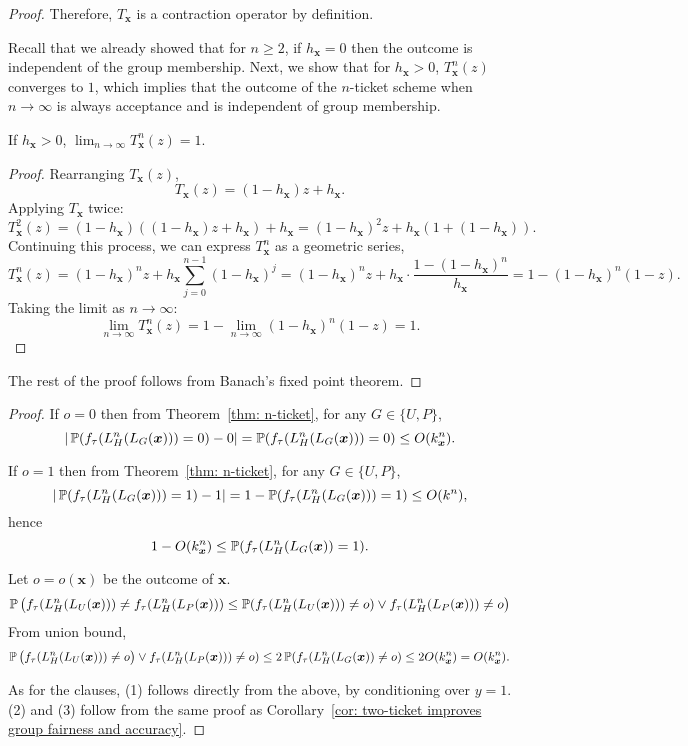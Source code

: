 \begin{proof}
Therefore, $T_{\bm{x}}$ is a contraction operator by definition.

Recall that we already showed that for $n\geq 2$, if $h_{\bm{x}}=0$ then the outcome is independent of the group membership. Next, we show that for $h_{\bm{x}}>0$, $T_{\bm{x}}^n(z)$ converges to $1$, which implies that the outcome of the $n$-ticket scheme when $n\rightarrow \infty$ is always acceptance and is independent of group membership.
\begin{claim}\label{claim:Tconvergence}
If $h_{\bm{x}}>0$, $
\lim_{n \to \infty} T_{\bm{x}}^n(z) =1$.
\end{claim}
\begin{proof}
Rearranging $T_{\bm{x}}(z)$,
\[
T_{\bm{x}}(z) = (1 - h_{\bm{x}})z + h_{\bm{x}}.
\]
Applying $T_{\bm{x}}$ twice:
\[
T_{\bm{x}}^2(z) = (1 - h_{\bm{x}})((1 - h_{\bm{x}})z + h_{\bm{x}}) + h_{\bm{x}}= (1 - h_{\bm{x}})^2 z + h_{\bm{x}}(1 + (1 - h_{\bm{x}})).
\]
Continuing this process, we can express $T_{\bm{x}}^n$ as a geometric series,
\[
T_{\bm{x}}^n(z) = (1 - h_{\bm{x}})^n z + h_{\bm{x}} \sum_{j=0}^{n-1} (1 - h_{\bm{x}})^j= (1 - h_{\bm{x}})^n z + h_{\bm{x}} \cdot \frac{1 - (1 - h_{\bm{x}})^n}{h_{\bm{x}}}= 1 - (1 - h_{\bm{x}})^n(1 - z).
\]
Taking the limit as \( n \to \infty \):
\[
\lim_{n \to \infty} T_{\bm{x}}^n(z) = 1 - \lim_{n \to \infty} (1 - h_{\bm{x}})^n(1 - z)=1.
\]    
\end{proof}
The rest of the proof follows from Banach's fixed point theorem.
\end{proof}

\corNticket*
\begin{proof}
    If $o=0$ then from Theorem~\ref{thm: n-ticket}, for any $G\in\{U,P\}$, $$|\operatorname*{\mathbb{P}}(f_\tau(L_H^{n}(L_G(\bm{x}))) = 0)- 0| =\operatorname*{\mathbb{P}}(f_\tau(L_H^{n}(L_G(\bm{x}))) = 0)\leq O(k_{\bm x}^n).$$
    
    If $o=1$ then from Theorem~\ref{thm: n-ticket}, for any $G\in\{U,P\}$, $$|\operatorname*{\mathbb{P}}(f_\tau(L_H^{n}(L_G(\bm{x}))) = 1)- 1| =1- \operatorname*{\mathbb{P}}(f_\tau(L_H^{n}(L_G(\bm{x}))) = 1)\leq O(k^n),$$ hence $$1- O(k_{\bm x}^n)\leq \operatorname*{\mathbb{P}}(f_\tau(L_H^{n}(L_G(\bm{x}))=1).$$

    Let $o=o(\bm x)$ be the outcome of $\bm x$. 
    \[
    \operatorname*{\mathbb{P}}\big(f_\tau(L_H^{n}(L_U(\bm{x}))) \ne f_\tau(L_H^{n}(L_P(\bm{x})))\leq     \operatorname*{\mathbb{P}}(f_\tau(L_H^{n}(L_U(\bm{x})))\ne o) \lor f_\tau(L_H^{n}(L_P(\bm{x})))\ne o\big)
    \]
    From union bound,
    \[
    \operatorname*{\mathbb{P}}\big(f_\tau(L_H^{n}(L_U(\bm{x})))\ne o\big) \lor f_\tau(L_H^{n}(L_P(\bm{x})))\ne o)\leq 2\operatorname*{\mathbb{P}}(f_\tau(L_H^{n}(L_G(\bm{x}))\ne o)\leq 2O(k_{\bm x}^n)=O(k_{\bm x}^n).
    \]

    As for the clauses, (1) follows directly from the above, by conditioning over $y=1$. (2) and (3) follow from the same proof as Corollary~\ref{cor: two-ticket improves group fairness and accuracy}.
\end{proof}